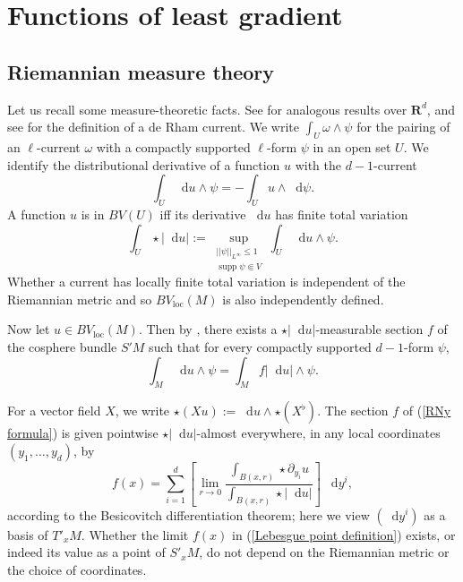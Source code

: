 \documentclass[reqno,12pt,letterpaper]{amsart}
\newcommand{\RR}{\mathbf{R}}
\DeclareMathOperator{\supp}{supp}
\newcommand*\dif{\mathop{}\!\mathrm{d}}
\newcommand{\loc}{\mathrm{loc}}
\theoremstyle{definition}
\numberwithin{equation}{section}
\begin{document}

\section{Functions of least gradient}\label{LeastGradientFunctions}
\subsection{Riemannian measure theory}
Let us recall some measure-theoretic facts.
See \cite[Chapter 1]{Giusti77} for analogous results over $\RR^d$, and see \cite{simon1983GMT} for the definition of a de Rham current.
We write $\int_U \omega \wedge \psi$ for the pairing of an $\ell$-current $\omega$ with a compactly supported $\ell$-form $\psi$ in an open set $U$.
We identify the distributional derivative of a function $u$ with the $d-1$-current
$$\int_U \dif u \wedge \psi = -\int_U u \wedge \dif \psi.$$
A function $u$ is in $BV(U)$ iff its derivative $\dif u$ has finite total variation
\begin{equation}\label{total variation}
\int_U \star |\dif u| := \sup_{\substack{||\psi||_{L^\infty} \leq 1\\\supp \psi \Subset V}} \int_U \dif u \wedge \psi.
\end{equation}
Whether a current has locally finite total variation is independent of the Riemannian metric and so $BV_\loc(M)$ is also independently defined.

Now let $u \in BV_\loc(M)$.
Then by \cite[Theorem 4.14]{simon1983GMT}, there exists a $\star |\dif u|$-measurable section $f$ of the cosphere bundle $S'M$ such that for every compactly supported $d-1$-form $\psi$,
\begin{equation}\label{RNy formula}
\int_M \dif u \wedge \psi = \int_M f|\dif u| \wedge \psi.
\end{equation}

For a vector field $X$, we write $\star (Xu) := \dif u \wedge \star (X^\flat)$.
The section $f$ of (\ref{RNy formula}) is given pointwise $\star |\dif u|$-almost everywhere, in any local coordinates $(y_1, \dots, y_d)$, by
\begin{equation}\label{Lebesgue point definition}
    f(x) = \sum_{i = 1}^d \left[\lim_{r \to 0} \frac{\int_{B(x, r)} \star \partial_{y_i} u}{\int_{B(x, r)} \star |\dif u|}\right] ~\dif y^i,
\end{equation}
according to the Besicovitch differentiation theorem; here we view $(\dif y^i)$ as a basis of $T'_xM$.
Whether the limit $f(x)$ in (\ref{Lebesgue point definition}) exists, or indeed its value as a point of $S'_xM$, do not depend on the Riemannian metric or the choice of coordinates.
\end{document}
